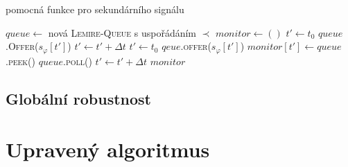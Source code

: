 \begin{algorithm}\label{algorithm:unary:signal}
\caption{pomocná funkce pro sekundárního signálu}
\begin{algorithmic}
	\State	$queue \gets $ nová \textsc{Lemire-Queue} s uspořádáním $\prec$
	\State	$monitor \gets ()$
	\State	$t' \gets t_0$
		\State $queue$.\textsc{Offer}($s_\varphi[t']$)
		\State $t' \gets t' + \Delta t$
	\EndWhile
	\State	$t' \gets t_0$
		\State	$qeue$.\textsc{offer}($s_\varphi[t']$)
		\State	$monitor[t'] \gets queue$.\textsc{peek()}
			\State	$queue$.\textsc{poll()}
		\EndIf
		\State	$t' \gets t' + \Delta t$
	\EndWhile
	\State\Return $monitor$
\EndFunction
\end{algorithmic}
\end{algorithm}

\subsection{Globální robustnost}





\section{Upravený algoritmus}\label{section:algorithm:updated}
